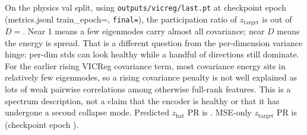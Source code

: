On the physics val split, using \texttt{outputs/vicreg/last.pt} at checkpoint epoch \EffRankCkptEpochVicreg{} (metrics.jsonl train\_epoch=\EffRankJsonlEpochVicreg{}, \texttt{final=\EffRankFinalVicreg{}}), the participation ratio of $z_{\mathrm{target}}$ is \EffRankTgtVicreg{} out of $D{=}$\ZTLatentDim{}. Near 1 means a few eigenmodes carry almost all covariance; near $D$ means the energy is spread. That is a different question from the per-dimension variance hinge: per-dim stds can look healthy while a handful of directions still dominate. For the earlier rising VICReg covariance term, most covariance energy sits in relatively few eigenmodes, so a rising covariance penalty is not well explained as lots of weak pairwise correlations among otherwise full-rank features. This is a spectrum description, not a claim that the encoder is healthy or that it has undergone a second collapse mode. Predicted $z_{\mathrm{hat}}$ PR is \EffRankHatVicreg{}. MSE-only $z_{\mathrm{target}}$ PR is \EffRankTgtMse{} (checkpoint epoch \EffRankCkptEpochMse{}).
